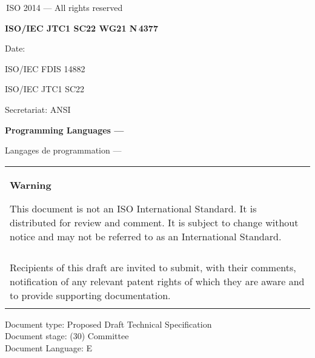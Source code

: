 

\thispagestyle{empty}
{\raisebox{.35ex}{\smaller\copyright}}\,ISO 2014 --- All rights reserved
\vspace{2ex}

\begin{flushright}
\textbf{ISO/IEC JTC1 SC22 WG21 N\,\LARGE4377}

Date: \reldate

ISO/IEC FDIS 14882

ISO/IEC JTC1 SC22

Secretariat: ANSI

\end{flushright}

\vfill

\textbf{\LARGE Programming Languages --- \Cpp}

Langages de programmation --- \Cpp

\vfill

\begin{tabular}{|p{\hsize}|}
\hline
\begin{center}
\textbf{Warning}
\end{center}

\vspace{2ex}

This document is not an ISO International Standard. It is distributed
for review and comment. It is subject to change without notice and may
not be referred to as an International Standard.\\\\

Recipients of this draft are invited to submit, with their comments,
notification of any relevant patent rights of which they are aware
and to provide supporting documentation.\\\\
\hline
\end{tabular}

\vfill
\noindent
Document type: Proposed Draft Technical Specification\\
Document stage: (30) Committee\\
Document Language: E
\pagebreak

\thispagestyle{cpppage}

